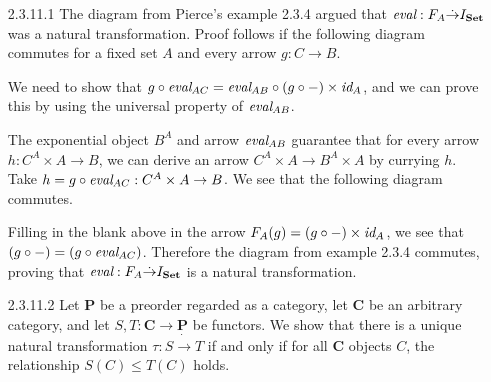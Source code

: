 \documentclass{article}
\newcommand{\ccat}{\mathbf{C}}
\newcommand{\id}{\emph{id}}
\newcommand{\cset}{\mathbf{Set}}
\newcommand{\eval}{\emph{eval}}
\newcommand{\curry}{\emph{curry}}
\newcommand{\natarrow}{\dot{\rightarrow}}
\newcommand{\pcat}{\mathbf{P}}
\begin{document}
\begin{enumerate}
\item [2.3.11.1]
  The diagram from Pierce's example 2.3.4 argued that $\eval : F_A \natarrow I_\cset$ was a natural transformation.
  Proof follows if the following diagram commutes for a fixed set $A$ and every arrow $g : C \rightarrow B$.
  \begin{center}
  \end{center}
  We need to show that $g \circ \eval_{AC} = \eval_{AB} \circ (g\circ -) \times \id_A$, and we can prove this by using the universal property of $\eval_{AB}$.
  
\subitem
  The exponential object $B^A$ and arrow $\eval_{AB}$ guarantee that for every arrow $h : C^A \times A \rightarrow B$, we can derive an arrow $C^A \times A \rightarrow B^A \times A$ by currying $h$.
  Take $h = g \circ \eval_{AC} : C^A \times A \rightarrow B$.
  We see that the following diagram commutes.
  \begin{center}
  \end{center}
  Filling in the blank above in the arrow $F_A(g) = (g \circ -) \times \id_A$, we see that $(g \circ -) = (g \circ \eval_{AC})$.
  Therefore the diagram from example 2.3.4 commutes, proving that $\eval : F_A \natarrow I_\cset$ is a natural transformation.
\newpage

\item [2.3.11.2]
  Let $\pcat$ be a preorder regarded as a category, let $\ccat$ be an arbitrary category, and let $S,T : \ccat \rightarrow \pcat$ be functors.
  We show that there is a unique natural transformation $\tau : S \natarrow T$ if and only if for all $\ccat$ objects $C$, the relationship $S(C) \le T(C)$ holds.


\end{enumerate}
\end{document}

